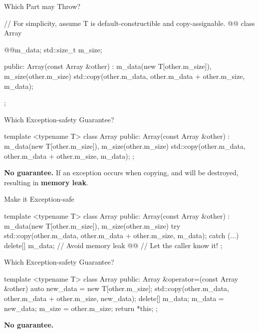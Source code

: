 \documentclass{beamer}
\begin{document}
\begin{frame}[fragile]{Which Part may Throw?}
  \begin{cpp}
// For simplicity, assume T is default-constructible and copy-assignable.
@@
class Array {
  @@m_data;
  std::size_t m_size;

 public:
  Array(const Array &other)
      : m_data(new T[other.m_size]),
        m_size(other.m_size) {
    std::copy(other.m_data,
              other.m_data + other.m_size, m_data);
  }
};
  \end{cpp}
\end{frame}

\begin{frame}[fragile]{Which Exception-safety Guarantee?}
  \begin{cpp}
template <typename T>
class Array {
 public:
  Array(const Array &other)
      : m_data(new T[other.m_size]),
        m_size(other.m_size) {
    std::copy(other.m_data,
              other.m_data + other.m_size, m_data);
  }
};
  \end{cpp}
  \pause
  \textbf{No guarantee.} If an exception occurs when copying,  and  will be destroyed, resulting in \textbf{memory leak}.
\end{frame}

\begin{frame}[fragile]{Make it Exception-safe}
  \begin{cpp}
template <typename T>
class Array {
 public:
  Array(const Array &other)
      : m_data(new T[other.m_size]),
        m_size(other.m_size) {
    try {
      std::copy(other.m_data,
                other.m_data + other.m_size, m_data);
    } catch (...) {
      delete[] m_data; // Avoid memory leak
      @@ // Let the caller know it!
    }
  }
};
  \end{cpp}
\end{frame}

\begin{frame}[fragile]{Which Exception-safety Guarantee?}
  \begin{cpp}
template <typename T>
class Array {
 public:
  Array &operator=(const Array &other) {
    auto new_data = new T[other.m_size];
    std::copy(other.m_data,
              other.m_data + other.m_size, new_data);
    delete[] m_data;
    m_data = new_data;
    m_size = other.m_size;
    return *this;
  }
};
  \end{cpp}
  \pause
  \textbf{No guarantee.}
\end{frame}
\end{document}
